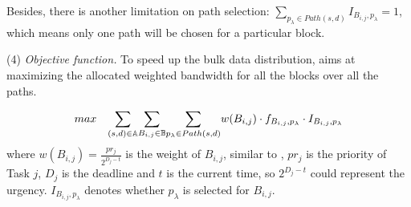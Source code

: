 Besides, there is another limitation on path selection: $\displaystyle{\sum_{p_\lambda \in Path(s,d)}} I_{B_{i,j},p_\lambda} = 1$, which means only one path will be chosen for a particular block.


\noindent(4) {\em Objective function.} To speed up the bulk data distribution, \name aims at maximizing the allocated weighted bandwidth for all the blocks over all the paths.

\begin{equation}
\centering
max \quad \displaystyle{\sum_{(s,d)\in \mathbb{A}}} \displaystyle{\sum_{B_{i,j} \in \mathbb{B}}} \displaystyle{\sum_{p_{\lambda}\in Path(s,d)}} w(B_{i,j})\cdot f_{B_{i,j},p_\lambda} \cdot I_{B_{i,j},p_\lambda}
\label{equation:objective}
\end{equation}
where $w(B_{i,j}) = \frac{pr_j}{2^{D_j-t}}$ is the weight of $B_{i,j}$, similar to \cite{zhang2015guaranteeing}, $pr_j$ is the priority of Task $j$, $D_j$ is the deadline and $t$ is the current time, so $2^{D_j-t}$ could represent the urgency. $I_{B_{i,j},p_\lambda}$ denotes whether $p_\lambda$ is selected for $B_{i,j}$.


